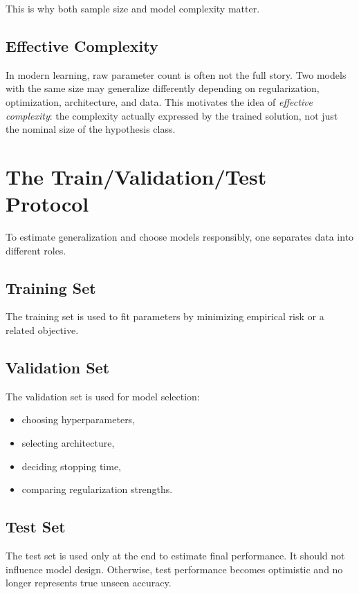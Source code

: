 This is why both sample size and model complexity matter.

\subsection{Effective Complexity}

In modern learning, raw parameter count is often not the full story. Two models with the same size may generalize differently depending on regularization, optimization, architecture, and data. This motivates the idea of \emph{effective complexity}: the complexity actually expressed by the trained solution, not just the nominal size of the hypothesis class.

\section{The Train/Validation/Test Protocol}

To estimate generalization and choose models responsibly, one separates data into different roles.

\subsection{Training Set}

The training set is used to fit parameters by minimizing empirical risk or a related objective.

\subsection{Validation Set}

The validation set is used for model selection:
\begin{itemize}
    \item choosing hyperparameters,
    \item selecting architecture,
    \item deciding stopping time,
    \item comparing regularization strengths.
\end{itemize}

\subsection{Test Set}

The test set is used only at the end to estimate final performance. It should not influence model design. Otherwise, test performance becomes optimistic and no longer represents true unseen accuracy.

